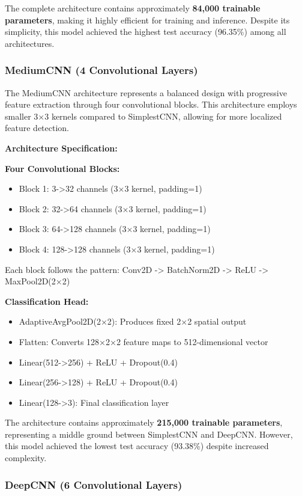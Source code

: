 \documentclass[12pt,a4paper]{article}
\begin{document}
The complete architecture contains approximately \textbf{84,000 trainable parameters}, making it highly efficient for training and inference. Despite its simplicity, this model achieved the highest test accuracy (96.35\%) among all architectures.

\subsubsection{MediumCNN (4 Convolutional Layers)}

The MediumCNN architecture represents a balanced design with progressive feature extraction through four convolutional blocks. This architecture employs smaller 3×3 kernels compared to SimplestCNN, allowing for more localized feature detection.

\textbf{Architecture Specification:}

\textbf{Four Convolutional Blocks:}
\begin{itemize}
    \item Block 1: 3->32 channels (3×3 kernel, padding=1)
    \item Block 2: 32->64 channels (3×3 kernel, padding=1)
    \item Block 3: 64->128 channels (3×3 kernel, padding=1)
    \item Block 4: 128->128 channels (3×3 kernel, padding=1)
\end{itemize}

Each block follows the pattern: Conv2D -> BatchNorm2D -> ReLU -> MaxPool2D(2×2)

\textbf{Classification Head:}
\begin{itemize}
    \item AdaptiveAvgPool2D(2×2): Produces fixed 2×2 spatial output
    \item Flatten: Converts 128×2×2 feature maps to 512-dimensional vector
    \item Linear(512->256) + ReLU + Dropout(0.4)
    \item Linear(256->128) + ReLU + Dropout(0.4)
    \item Linear(128->3): Final classification layer
\end{itemize}

The architecture contains approximately \textbf{215,000 trainable parameters}, representing a middle ground between SimplestCNN and DeepCNN. However, this model achieved the lowest test accuracy (93.38\%) despite increased complexity.

\subsubsection{DeepCNN (6 Convolutional Layers)}
\end{document}
